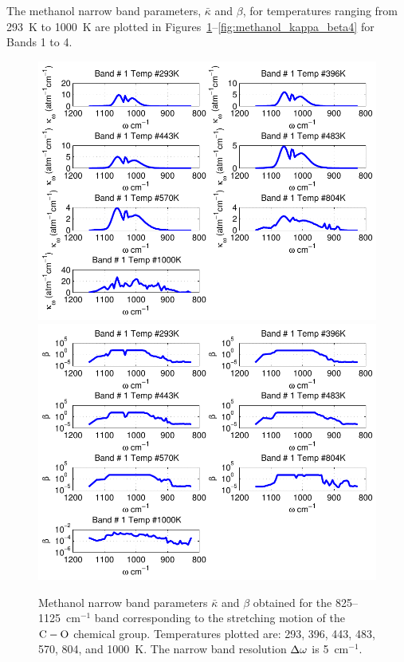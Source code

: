 The methanol narrow band parameters, $\bar{\kappa}$ and $\beta$, for temperatures ranging from 293~K to 1000~K are plotted in Figures~\ref{fig:methanol_kappa_beta1}--\ref{fig:methanol_kappa_beta4} for Bands 1 to 4.

\newpage

\begin{figure}[p]
\begin{center}
\includegraphics[width=5.0in]{Figures/Methanol_Kappa_Band1_MALKMUS.pdf}
\includegraphics[width=5.0in]{Figures/Methanol_Beta_Band1_MALKMUS.pdf}
\end{center}
\caption{Methanol narrow band parameters $\bar{\kappa}$ and $\beta$ obtained for the 825--1125~cm$^{-1}$ band corresponding to the stretching motion of the $\rm C-O$ chemical group. Temperatures plotted are: 293, 396, 443, 483, 570, 804, and 1000~K. The narrow band resolution $\Delta \omega$ is 5~cm$^{-1}$.\label{fig:methanol_kappa_beta1}}
\end{figure}

